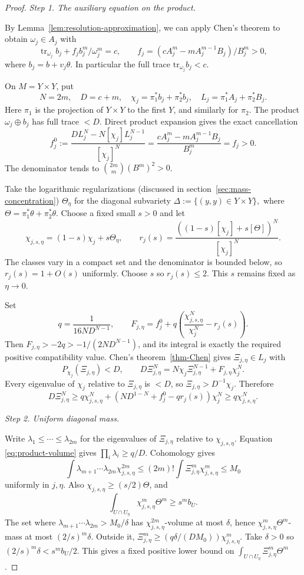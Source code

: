 \documentclass[reqno]{amsart}
\theoremstyle{remark}
\def\tr{\text{tr}}
\theoremstyle{plain}
\begin{document}
\begin{proof}
\emph{Step 1. The auxiliary equation on the product.}

By Lemma~\ref{lem:resolution-approximation}, we can apply Chen's theorem to obtain \(\omega_j\in A_j\) with
\[
\operatorname{tr}_{\omega_j}b_j+
f_j b_j^m/\omega_j^m=c,\qquad
f_j=(cA_j^m-mA_j^{m-1}B_j)/B_j^m>0,
\]
where \(b_j=b+v_j\theta\). In particular the full trace $\tr_{\omega_j}b_j<c$.

On \(M=Y\times Y\), put
\[
N=2m,\quad D=c+m,\quad
\chi_j=\pi_1^*b_j+\pi_2^*b_j,\quad
L_j=\pi_1^*A_j+\pi_2^*B_j.
\]
Here $\pi_1$ is the projection of $Y\times Y$ to the first $Y$, and similarly for $\pi_2$.
The product \(\omega_j\oplus b_j\) has full trace \(<D\). Direct product expansion gives the exact cancellation
\[
f_j^0:=\frac{DL_j^N-N[\chi_j]L_j^{N-1}}{[\chi_j]^N}
=\frac{cA_j^m-mA_j^{m-1}B_j}{B_j^m}=f_j>0.
\]
The denominator tends to \(\binom{2m}{m}(B^m)^2>0\).

Take the logarithmic regularizations (discussed in section~\ref{sec:mass-concentration}) \(\Theta_\eta\) for the diagonal subvariety $\Delta:=\{(y,y)\in Y\times Y\},$ where $\Theta=\pi_1^*\theta+ \pi_2^*\theta$.  Choose a fixed small \(s>0\) and let
\[
\chi_{j,s,\eta}=(1-s)\chi_j+s\Theta_\eta,\qquad
r_j(s)=\frac{((1-s)[\chi_j]+s[\Theta])^N}{[\chi_j]^N}.
\]
The classes vary in a compact set and the denominator is bounded below, so \(r_j(s)=1+O(s)\) uniformly. Choose \(s\) so \(r_j(s)\le2\). This $s$ remains fixed as \(\eta\to0\).

Set
\[
q=\frac1{16ND^{N-1}},\qquad
F_{j,\eta}=f_j^0+q\left(\frac{\chi_{j,s,\eta}^N}{\chi_j^N}-r_j(s)\right).
\]
Then \(F_{j,\eta}>-2q>-1/(2ND^{N-1})\), and its integral is exactly the required positive compatibility value. Chen's theorem~\ref{thm-Chen} gives \(\Xi_{j,\eta}\in L_j\) with
\[
P_{\chi_j}(\Xi_{j,\eta})<D,\qquad
D\Xi_{j,\eta}^N=N\chi_j\Xi_{j,\eta}^{N-1}
+F_{j,\eta}\chi_j^N.
\]
Every eigenvalue of \(\chi_j\) relative to \(\Xi_{j,\eta}\) is \(<D\), so \(\Xi_{j,\eta}>D^{-1}\chi_j\). Therefore
\begin{equation}\label{eq:product-volume}
D\Xi_{j,\eta}^N
\ge q\chi_{j,s,\eta}^N+
\left(ND^{1-N}+f_j^0-qr_j(s)\right)\chi_j^N
\ge q\chi_{j,s,\eta}^N.
\end{equation}

\emph{Step 2. Uniform diagonal mass.}

Write \(\lambda_1\le\cdots\le\lambda_{2m}\) for the eigenvalues of \(\Xi_{j,\eta}\) relative to \(\chi_{j,s,\eta}\). Equation \eqref{eq:product-volume} gives \(\prod_i\lambda_i\ge q/D\). Cohomology gives
\[
\int \lambda_{m+1}\cdots\lambda_{2m}\chi_{j,s,\eta}^{2m}
\le(2m)!\int\Xi_{j,\eta}^m\chi_{j,s,\eta}^m\le M_0
\]
uniformly in \(j,\eta\). Also \(\chi_{j,s,\eta}\ge(s/2)\Theta\), and
\[
\int_{U\cap U_\eta}\chi_{j,s,\eta}^m\Theta^m\ge s^mb_U.
\]
The set where \(\lambda_{m+1}\cdots\lambda_{2m}>M_0/\delta\) has
\(\chi_{j,s,\eta}^{2m}\)-volume at most \(\delta\), hence
\(\chi_{j,s,\eta}^m\Theta^m\)-mass at most \((2/s)^m\delta\).
Outside it,
\(\Xi_{j,\eta}^m\ge(q\delta/(DM_0))\chi_{j,s,\eta}^m\).
Take \(\delta>0\) so \((2/s)^m\delta<s^mb_U/2\). This gives a fixed positive lower bound on
\(\int_{U\cap U_\eta}\Xi_{j,\eta}^m\Theta^m\).


\end{proof}
\end{document}
